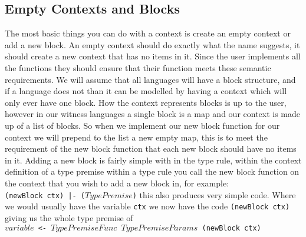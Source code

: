 \subsection{Empty Contexts and Blocks}
The most basic things you can do with a context is create an empty context or add a new block.
An empty context should do exactly what the name suggests, it should create a new context that has no items in it.
Since the user implements all the functions they should ensure that their function meets these semantic requirements.
We will assume that all languages will have a block structure, and if a language does not than it can be modelled by having a context which will only ever have one block.
How the context represents blocks is up to the user, however in our witness languages a single block is a map and our context is made up of a list of blocks.
So when we implement our new block function for our context we will prepend to the list a new empty map, this is to meet the requirement of the new block function that each new block should have no items in it.
Adding a new block is fairly simple with in the type rule, within the context definition of a type premise within a type rule you call the new block function on the context that you wish to add a new block in, for example:\\\texttt{{(newBlock ctx)} |- ($TypePremise$)}
this also produces very simple code.
Where we would usually have the variable \texttt{ctx} we now have the code \texttt{(newBlock ctx)} giving us the whole type premise of\\\texttt{$variable$ <- $TypePremiseFunc$ $TypePremiseParams$ (newBlock ctx)}
